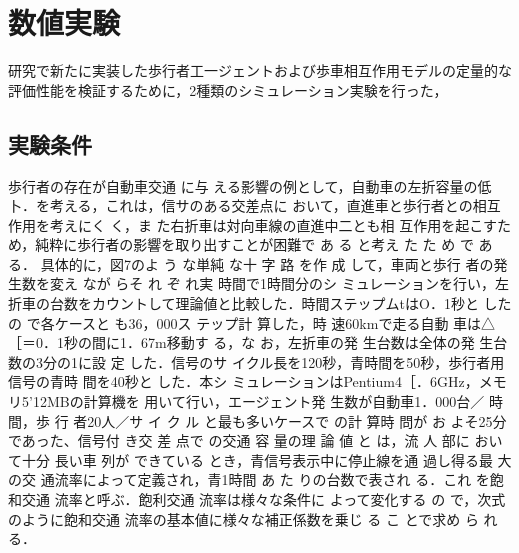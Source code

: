 \chapter{数値実験}

研究で新たに実装した歩行者工一ジェントおよび歩車相互作用モデルの定量的な評価性能を検証するために，2種類のシミュレーション実験を行った，

\section{実験条件}

歩行者の存在が自動車交通 に与 える影響の例として，自動車の左折容量の低卜．を考える，これは，信サのある交差点に おいて，直進車と歩行者との相互作用を考えにく く，ま た右折車は対向車線の直進中二とも相 互作用を起こすた め，純粋に歩行者の影響を取り出すことが困難で あ る と考え た た め で あ る．  具体的に，図7のよ う な単純 な十 字 路 を作 成 して，車両と歩行 者の発生数を変え なが らそ れ ぞ れ実 時間で1時間分のシ ミュレーションを行い，左折車の台数をカウントして理論値と比較した．時間ステップムtはO．1秒と したの で各ケースと も36，000ス テップ計 算した，時 速60kmで走る自動 車は△ ［＝0．1秒の間に1．67m移動す る，な お，左折車の発 生台数は全体の発 生台数の3分の1に設 定 した．信号のサ イクル長を120秒，青時間を50秒，歩行者用 信号の青時 間を40秒と した．本シ ミュレーションはPentium4［．6GHz，メモリ5’12MBの計算機を 用いて行い，エージェント発 生数が自動車1．000台／ 時 間，歩 行 者20人／サ イ ク ル と最も多いケースで の計 算時 問が お よそ25分であった、信号付 き交 差 点で の交通 容 量の理 論 値 と は，流 人 部に おい て十分 長い車 列が できている とき，青信号表示中に停止線を通 過し得る最 大の交 通流率によって定義され，青1時間 あ た りの台数で表され る．これ を飽 和交通 流率と呼ぶ．飽利交通 流率は様々な条件に よって変化する の で，次式のように飽和交通 流率の基本値に様々な補正係数を乗じ る こ とで求め ら れ る．

